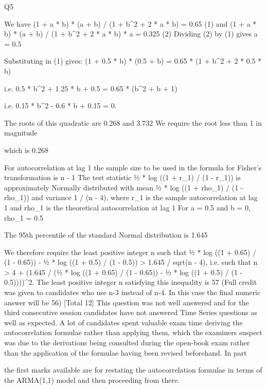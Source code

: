 Q5
\item  
We have (1 + a * b) * (a + b) / (1 + b^2 + 2 * a * b) = 0.65 (1) 
and (1 + a * b) * (a + b) / (1 + b^2 + 2 * a * b) * a = 0.325 (2) 
Dividing (2) by (1) gives a = 0.5 \item 
Substituting in (1) gives:
(1 + 0.5 * b) * (0.5 + b) = 0.65 * (1 + b^2 + 2 * 0.5 * b) \item 
i.e. 0.5 * b^2 + 1.25 * b + 0.5 = 0.65 * (b^2 + b + 1) \item 
i.e. 0.15 * b^2 - 0.6 * b + 0.15 = 0. \item 
The roots of this quadratic are 0.268 and 3.732 
We require the root less than 1 in magnitude \item 
which is 0.268 \item 
\item  
For autocorrelation at lag 1 the sample size to be used in the formula for Fisher’s transformation is n - 1 
The test statistic ½ * log ((1 + r_1) / (1 - r_1)) is approximately Normally distributed
with mean ½ * log ((1 + rho_1) / (1 - rho_1)) and variance 1 / (n - 4), where r_1 is
the sample autocorrelation at lag 1 and rho_1 is the theoretical autocorrelation at
lag 1 
For a = 0.5 and b = 0, rho_1 = 0.5 \item 
The 95th percentile of the standard Normal distribution is 1.645 \item 
We therefore require the least positive integer n such that
½ * log ((1 + 0.65) / (1 - 0.65)) - ½ * log ((1 + 0.5) / (1 - 0.5)) > 1.645 / sqrt(n - 4), 
i.e. such that
n > 4 + (1.645 / (½ * log ((1 + 0.65) / (1 - 0.65)) - ½ * log ((1 + 0.5) / (1 - 0.5))))^2. 
The least positive integer n satisfying this inequality is 57 
(Full credit was given to candidates who use n-3 instead of n-4. In this case the final numeric answer will be 56)
[Total 12]
\medskip 
This question was not well answered and for the third consecutive session candidates have not answered Time Series questions as well as expected. A lot of candidates spent valuable exam time deriving the autocorrelation formulae rather than applying them, which the examiners suspect was due to the derivations being consulted during the open-book exam rather than the application of the formulae having been revised beforehand.
In part \item   the first marks available are for restating the autocorrelation formulae in terms of the ARMA(1,1) model and then proceeding from there.
